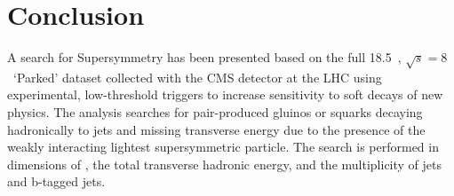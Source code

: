 \chapter{Conclusion}
\label{ch:conclusion}

\ifpdf
    \graphicspath{{Chapter10/Figs/Raster/}{Chapter10/Figs/PDF/}{Chapter10/Figs/}}
\else
    \graphicspath{{Chapter10/Figs/Vector/}{Chapter10/Figs/}}
\fi
















A search for Supersymmetry has been presented based on the full 18.5~\fb, 
$\sqrt{s} = 8$~\tev `Parked' dataset collected with the CMS detector at the LHC
using experimental, low-threshold triggers to increase sensitivity to soft
decays of new physics. The
analysis searches for pair-produced gluinos or squarks decaying hadronically to
jets and missing transverse energy due to the presence of the weakly interacting
lightest supersymmetric particle. The search is performed in dimensions of \HT,
the total transverse hadronic energy, and the multiplicity of jets and b-tagged
jets.

